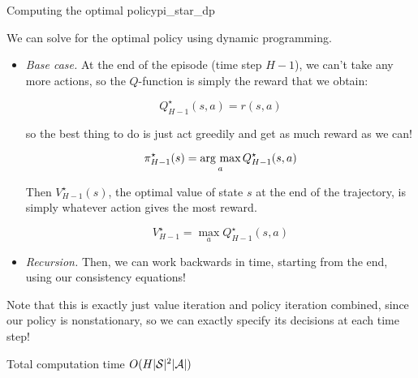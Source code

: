 \documentclass[../main/main]{subfiles}
\begin{document}
\begin{theorem}{Computing the optimal policy}{pi_star_dp}

We can solve for the optimal policy using dynamic programming.

\begin{itemize}
\item \emph{Base case.} At the end of the episode (time step $H-1$),
    we can't take any more actions, so the $Q$-function is simply the reward
    that we obtain:

    \[
        Q^\star_{H-1}(s, a) = r(s, a)
    \]

    so the best thing to do is just act greedily
    and get as much reward as we can!

    \[
        \pi^\star_{H-1}(s) = \operatorname*{\textrm{arg\ max}}_a Q^\star_{H-1}(s, a)
    \]

    Then $V^\star_{H-1}(s)$, the optimal value of state $s$ at the end of the
    trajectory, is simply whatever action gives the most reward.

    \[
        V^\star_{H-1} = \max_a Q^\star_{H-1}(s, a)
    \]

\item \emph{Recursion.} Then, we can work backwards in time, starting from the
    end, using our consistency equations!
\end{itemize}

Note that this is exactly just value iteration and policy iteration combined,
since our policy is nonstationary, so we can exactly specify its decisions at
each time step!



Total computation time $O(H |\mathcal{S}|^2 |\mathcal{A}|)$



\end{theorem}
\end{document}
